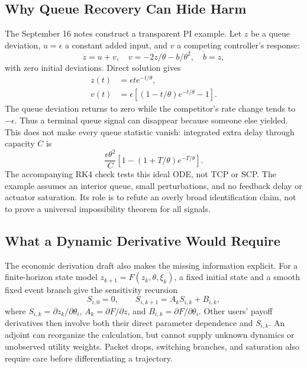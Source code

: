 \documentclass[conference,letterpaper]{IEEEtran}
\begin{document}
\subsection{Why Queue Recovery Can Hide Harm}
The September 16 notes construct a transparent PI example. Let $z$ be a queue deviation, $u=\epsilon$ a constant added input, and $v$ a competing controller's response:
\begin{equation}
\dot z=u+v,\quad v=-2z/\theta-b/\theta^2,\quad\dot b=z,
\end{equation}
with zero initial deviations. Direct solution gives
\begin{align}
z(t)&=\epsilon t e^{-t/\theta},\\
v(t)&=\epsilon[(1-t/\theta)e^{-t/\theta}-1].
\end{align}
The queue deviation returns to zero while the competitor's rate change tends to $-\epsilon$. Thus a terminal queue signal can disappear because someone else yielded. This does not make every queue statistic vanish: integrated extra delay through capacity $C$ is
\begin{equation}
\frac{\epsilon\theta^2}{C}
\left[1-(1+T/\theta)e^{-T/\theta}\right].
\end{equation}
The accompanying RK4 check tests this ideal ODE, not TCP or SCP. The example assumes an interior queue, small perturbations, and no feedback delay or actuator saturation. Its role is to refute an overly broad identification claim, not to prove a universal impossibility theorem for all signals.

\subsection{What a Dynamic Derivative Would Require}
The economic derivation draft also makes the missing information explicit. For a finite-horizon state model $z_{k+1}=F(z_k,\theta,\xi_k)$, a fixed initial state and a smooth fixed event branch give the sensitivity recursion
\begin{equation}
S_{i,0}=0,\qquad S_{i,k+1}=A_kS_{i,k}+B_{i,k},
\end{equation}
where $S_{i,k}=\partial z_k/\partial\theta_i$, $A_k=\partial F/\partial z$, and $B_{i,k}=\partial F/\partial\theta_i$. Other users' payoff derivatives then involve both their direct parameter dependence and $S_{i,k}$. An adjoint can reorganize the calculation, but cannot supply unknown dynamics or unobserved utility weights. Packet drops, switching branches, and saturation also require care before differentiating a trajectory.
\end{document}

